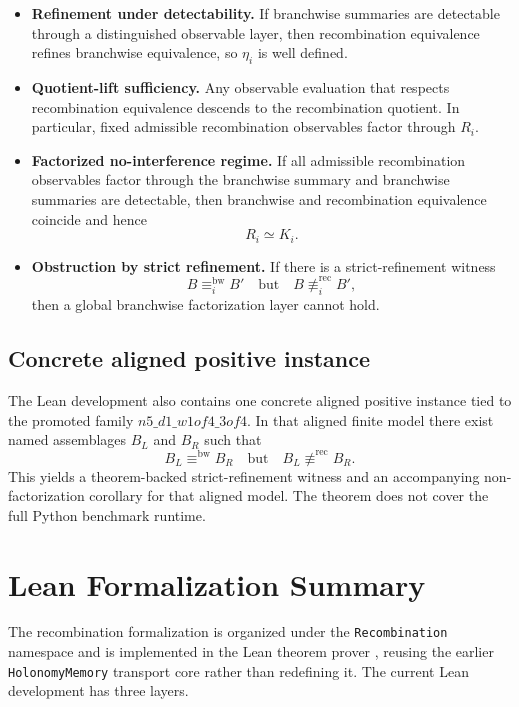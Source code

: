 \documentclass[11pt]{article}
\theoremstyle{definition}
\begin{document}
\begin{itemize}
\item \textbf{Refinement under detectability.} If branchwise summaries are detectable through a distinguished observable layer, then recombination equivalence refines branchwise equivalence, so \(\eta_i\) is well defined.

\item \textbf{Quotient-lift sufficiency.} Any observable evaluation that respects recombination equivalence descends to the recombination quotient. In particular, fixed admissible recombination observables factor through \(R_i\).

\item \textbf{Factorized no-interference regime.} If all admissible recombination observables factor through the branchwise summary and branchwise summaries are detectable, then branchwise and recombination equivalence coincide and hence
\[
R_i \simeq K_i.
\]

\item \textbf{Obstruction by strict refinement.} If there is a strict-refinement witness
\[
B \equiv_i^{\mathrm{bw}} B'
\quad\text{but}\quad
B \not\equiv_i^{\mathrm{rec}} B',
\]
then a global branchwise factorization layer cannot hold.
\end{itemize}

\subsection{Concrete aligned positive instance}

The Lean development also contains one concrete aligned positive instance tied to the promoted family \(n5\_d1\_w1of4\_3of4\). In that aligned finite model there exist named assemblages \(B_L\) and \(B_R\) such that
\[
B_L \equiv^{\mathrm{bw}} B_R
\quad\text{but}\quad
B_L \not\equiv^{\mathrm{rec}} B_R.
\]
This yields a theorem-backed strict-refinement witness and an accompanying non-factorization corollary for that aligned model. The theorem does not cover the full Python benchmark runtime.
 \section{Lean Formalization Summary}

The recombination formalization is organized under the \texttt{Recombination} namespace and is implemented in the Lean theorem prover \cite{deMouraEtAl2015Lean}, reusing the earlier \texttt{HolonomyMemory} transport core rather than redefining it. The current Lean development has three layers.
\end{document}

